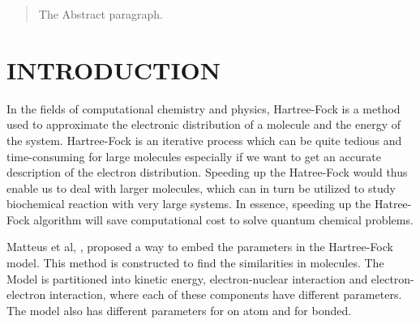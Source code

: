 \documentclass[twoside]{article}
\begin{document}
%

%


\begin{abstract}
  The Abstract paragraph.
\end{abstract}

\section{INTRODUCTION}
In the fields of computational chemistry and physics, Hartree-Fock is a method used to approximate the electronic distribution of a molecule and the energy of the system. Hartree-Fock is an iterative process which can be quite tedious and time-consuming for large molecules especially if we want to get an accurate description of the electron distribution. Speeding up the Hatree-Fock would thus enable us to deal with larger molecules, which can in turn be utilized to study biochemical reaction with very large systems. In essence, speeding up the Hatree-Fock algorithm will save computational cost to solve quantum chemical problems. 



Matteus et al, \cite{Matteus}, proposed a way to embed the parameters in the Hartree-Fock model. This method is constructed to find the similarities in molecules. The Model is partitioned into kinetic energy, electron-nuclear interaction and electron-electron interaction, where each of these components have different parameters. The model also has different parameters for on atom and for bonded.
\end{document}
